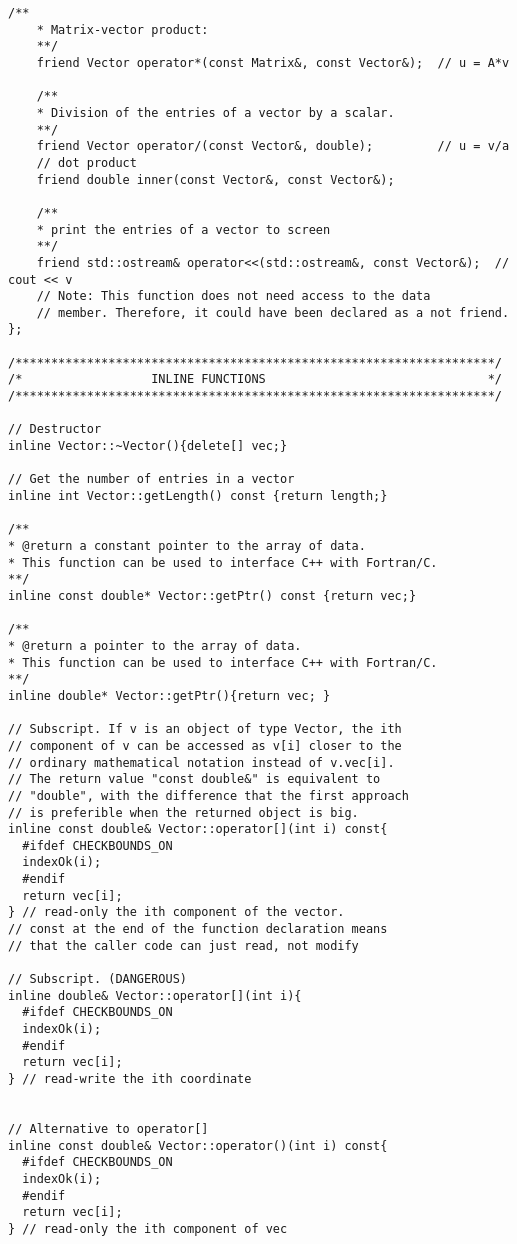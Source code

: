 \begin{lstlisting}[title={\url{http://folk.uio.no/mhjensen/compphys/programs/chapter03/cpp/Vector.h}}]
    /**
    * Matrix-vector product:
    **/      
    friend Vector operator*(const Matrix&, const Vector&);  // u = A*v
              
    /**
    * Division of the entries of a vector by a scalar.
    **/
    friend Vector operator/(const Vector&, double);         // u = v/a 
    // dot product
    friend double inner(const Vector&, const Vector&);                
    
    /**
    * print the entries of a vector to screen
    **/
    friend std::ostream& operator<<(std::ostream&, const Vector&);  // cout << v
    // Note: This function does not need access to the data 
    // member. Therefore, it could have been declared as a not friend.
};

/*******************************************************************/
/*                  INLINE FUNCTIONS                               */
/*******************************************************************/

// Destructor
inline Vector::~Vector(){delete[] vec;}      

// Get the number of entries in a vector
inline int Vector::getLength() const {return length;} 

/**
* @return a constant pointer to the array of data.
* This function can be used to interface C++ with Fortran/C.
**/
inline const double* Vector::getPtr() const {return vec;}

/**
* @return a pointer to the array of data.
* This function can be used to interface C++ with Fortran/C.
**/
inline double* Vector::getPtr(){return vec; }

// Subscript. If v is an object of type Vector, the ith 
// component of v can be accessed as v[i] closer to the 
// ordinary mathematical notation instead of v.vec[i]. 
// The return value "const double&" is equivalent to
// "double", with the difference that the first approach
// is preferible when the returned object is big.
inline const double& Vector::operator[](int i) const{
  #ifdef CHECKBOUNDS_ON
  indexOk(i);
  #endif
  return vec[i];
} // read-only the ith component of the vector.
// const at the end of the function declaration means
// that the caller code can just read, not modify

// Subscript. (DANGEROUS)
inline double& Vector::operator[](int i){ 
  #ifdef CHECKBOUNDS_ON
  indexOk(i);
  #endif
  return vec[i];
} // read-write the ith coordinate


// Alternative to operator[]
inline const double& Vector::operator()(int i) const{
  #ifdef CHECKBOUNDS_ON
  indexOk(i);
  #endif
  return vec[i];
} // read-only the ith component of vec


\end{lstlisting}
